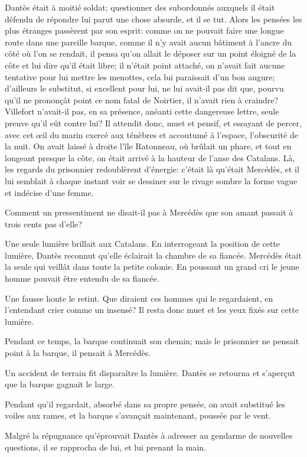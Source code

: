Dantès était à moitié soldat; questionner des subordonnés auxquels il était défendu de répondre lui parut une chose absurde, et il se tut. Alors les pensées les plus étranges passèrent par son esprit: comme on ne pouvait faire une longue route dans une pareille barque, comme il n'y avait aucun bâtiment à l'ancre du côté où l'on se rendait, il pensa qu'on allait le déposer sur un point éloigné de la côte et lui dire qu'il était libre; il n'était point attaché, on n'avait fait aucune tentative pour lui mettre les menottes, cela lui paraissait d'un bon augure; d'ailleurs le substitut, si excellent pour lui, ne lui avait-il pas dit que, pourvu qu'il ne prononçât point ce nom fatal de Noirtier, il n'avait rien à craindre? Villefort n'avait-il pas, en sa présence, anéanti cette dangereuse lettre, seule preuve qu'il eût contre lui? Il attendit donc, muet et pensif, et essayant de percer, avec cet œil du marin exercé aux ténèbres et accoutumé à l'espace, l'obscurité de la nuit. On avait laissé à droite l'île Ratonneau, où brûlait un phare, et tout en longeant presque la côte, on était arrivé à la hauteur de l'anse des Catalans. Là, les regards du prisonnier redoublèrent d'énergie: c'était là qu'était Mercédès, et il lui semblait à chaque instant voir se dessiner sur le rivage sombre la forme vague et indécise d'une femme.

Comment un pressentiment ne disait-il pas à Mercédès que son amant passait à trois cents pas d'elle?

Une seule lumière brillait aux Catalans. En interrogeant la position de cette lumière, Dantès reconnut qu'elle éclairait la chambre de sa fiancée. Mercédès était la seule qui veillât dans toute la petite colonie. En poussant un grand cri le jeune homme pouvait être entendu de sa fiancée.

Une fausse honte le retint. Que diraient ces hommes qui le regardaient, en l'entendant crier comme un insensé? Il resta donc muet et les yeux fixés sur cette lumière.

Pendant ce temps, la barque continuait son chemin; mais le prisonnier ne pensait point à la barque, il pensait à Mercédès.

Un accident de terrain fit disparaître la lumière. Dantès se retourna et s'aperçut que la barque gagnait le large.

Pendant qu'il regardait, absorbé dans sa propre pensée, on avait substitué les voiles aux rames, et la barque s'avançait maintenant, poussée par le vent.

Malgré la répugnance qu'éprouvait Dantès à adresser au gendarme de nouvelles questions, il se rapprocha de lui, et lui prenant la main.


